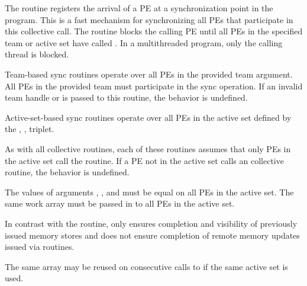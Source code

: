 \begin{apidefinition}
{{\color{Green}
    The routine registers the arrival of a \ac{PE} at a synchronization point in the program.
    This is a fast mechanism for synchronizing all \acp{PE} that participate in this
    collective call. The routine blocks the calling \ac{PE} until all \acp{PE} in the
    specified team or active set have called . In a multithreaded \openshmem
    program, only the calling thread is blocked.

    Team-based sync routines operate over all \acp{PE} in the provided team argument. All
    \acp{PE} in the provided team must participate in the sync operation.
    If an invalid team handle or 
    is passed to this routine, the behavior is undefined.

    Active-set-based sync routines operate over all \acp{PE} in the active set
    defined by the , ,  triplet.
}

    As with all \oldtext{\openshmem}  collective routines,
    each of these routines assumes
    that only \acp{PE} in the active set call the routine.  If a \ac{PE} not in
    the active set calls an \oldtext{\openshmem}  collective routine,
    the behavior is undefined.

    The values of arguments , , and
     must be equal on all \acp{PE} in the active set.  The same
    work array must be passed in  to all \acp{PE} in the active set.

    In contrast with the  routine,  only
    ensures completion and visibility of previously issued memory stores and does not ensure
    completion of remote memory updates issued via \openshmem routines.

    The same  array may be reused on consecutive calls to
     if the same active set is used.
}


\end{apidefinition}
